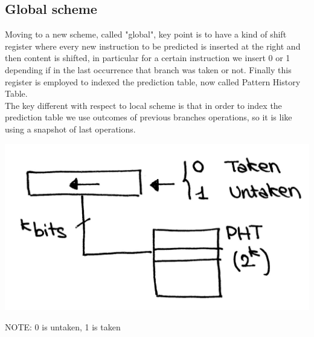 \subsection{Global scheme}
Moving to a new scheme, called "global", key point is to have a kind of shift
register where every new instruction to be predicted is inserted at the right
and then content is shifted, in particular for a certain instruction we insert
0 or 1 depending if in the last occurrence that branch was taken or not. Finally
this register is employed to indexed the prediction table, now called Pattern
History Table.\\
The key different with respect to local scheme is that in order to index the
prediction table we use outcomes of previous branches operations, so it is like
using a snapshot of last operations.
\begin{center}
  \includegraphics[width=0.6\linewidth]{img/img3/19}
\end{center}
\large{NOTE: 0 is untaken, 1 is taken}
